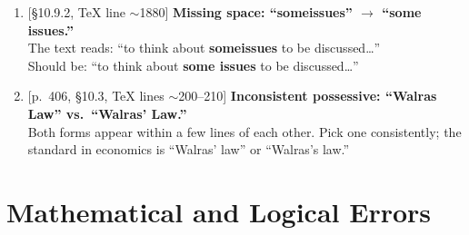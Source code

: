 \documentclass[11pt]{article}
\newcommand{\Err}[1]{\textbf{\color{red}#1}}
\newcommand{\Fix}[1]{\textbf{\color{green!50!black}#1}}
\newcommand{\loc}[1]{\textsf{\small [#1]}}
\begin{document}
\begin{enumerate}[label=\textbf{G\arabic*.}, leftmargin=2em]
\item \loc{\S10.9.2, TeX line $\sim$1880}
\textbf{Missing space: ``someissues'' $\to$ ``some issues.''}\\
The text reads: ``to think about \Err{someissues} to be discussed\ldots''\\
Should be: ``to think about \Fix{some issues} to be discussed\ldots''

\item \loc{p.~406, \S10.3, TeX lines $\sim$200--210}
\textbf{Inconsistent possessive: ``Walras Law'' vs.\ ``Walras' Law.''}\\
Both forms appear within a few lines of each other. Pick one consistently; the standard in economics is ``Walras' law'' or ``Walras's law.''

\end{enumerate}


\section{Mathematical and Logical Errors}
\end{document}
